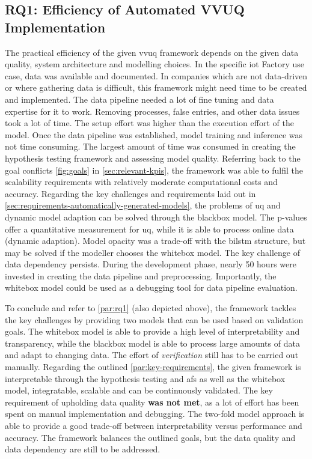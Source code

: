 \subsection{RQ1: Efficiency of Automated VVUQ Implementation}
\label{sec:discussion_rq1}
The practical efficiency of the given \gls{vvuq} framework depends on the given data quality, system architecture and modelling choices. In the specific \gls{iot} Factory use case, data was available and documented. In companies which are not data-driven or where gathering data is difficult, this framework might need time to be created and implemented. The data pipeline needed a lot of fine tuning and data expertise for it to work. Removing processes, false entries, and other data issues took a lot of time. The setup effort was higher than the execution effort of the model. Once the data pipeline was established, model training and inference was not time consuming. The largest amount of time was consumed in creating the hypothesis testing framework and assessing model quality. Referring back to the goal conflicts \autoref{fig:goals} in \autoref{sec:relevant-kpis}, the framework was able to fulfil the scalability requirements with relatively moderate computational costs and accuracy. Regarding the key challenges and requirements laid out in \autoref{sec:requirements-automatically-generated-models}, the problems of \gls{uq} and dynamic model adaption can be solved through the blackbox model. The p-values offer a quantitative measurement for \gls{uq}, while it is able to process online data (dynamic adaption). Model opacity was a trade-off with the \gls{bilstm} structure, but may be solved if the modeller chooses the whitebox model.
The key challenge of data dependency persists. During the development phase, nearly 50 hours were invested in creating the data pipeline and preprocessing. Importantly, the whitebox model could be used as a debugging tool for data pipeline evaluation.

To conclude and refer to \autoref{par:rq1} (also depicted above), the framework tackles the key challenges by providing two models that can be used based on validation goals. The whitebox model is able to provide a high level of interpretability and transparency, while the blackbox model is able to process large amounts of data and adapt to changing data. The effort of \textit{verification} still has to be carried out manually. Regarding the outlined \autoref{par:key-requirements}, the given framework is interpretable through the hypothesis testing and \gls{afs} as well as the whitebox model, integratable, scalable and can be continuously validated. The key requirement of upholding data quality \textbf{was not met}, as a lot of effort has been spent on manual implementation and debugging. The two-fold model approach is able to provide a good trade-off between interpretability versus performance and accuracy. The framework balances the outlined goals, but the data quality and data dependency are still to be addressed.

